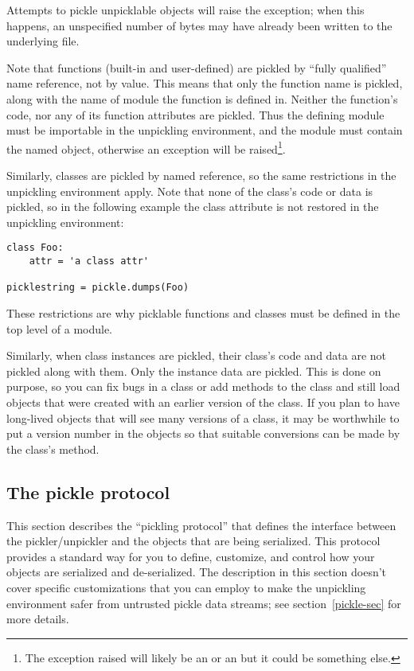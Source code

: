 Attempts to pickle unpicklable objects will raise the
 exception; when this happens, an unspecified
number of bytes may have already been written to the underlying file.

Note that functions (built-in and user-defined) are pickled by ``fully
qualified'' name reference, not by value.  This means that only the
function name is pickled, along with the name of module the function
is defined in.  Neither the function's code, nor any of its function
attributes are pickled.  Thus the defining module must be importable
in the unpickling environment, and the module must contain the named
object, otherwise an exception will be raised\footnote{The exception
raised will likely be an  or an
 but it could be something else.}.

Similarly, classes are pickled by named reference, so the same
restrictions in the unpickling environment apply.  Note that none of
the class's code or data is pickled, so in the following example the
class attribute  is not restored in the unpickling
environment:

\begin{verbatim}
class Foo:
    attr = 'a class attr'

picklestring = pickle.dumps(Foo)
\end{verbatim}

These restrictions are why picklable functions and classes must be
defined in the top level of a module.

Similarly, when class instances are pickled, their class's code and
data are not pickled along with them.  Only the instance data are
pickled.  This is done on purpose, so you can fix bugs in a class or
add methods to the class and still load objects that were created with
an earlier version of the class.  If you plan to have long-lived
objects that will see many versions of a class, it may be worthwhile
to put a version number in the objects so that suitable conversions
can be made by the class's  method.

\subsection{The pickle protocol
\label{pickle-protocol}}

This section describes the ``pickling protocol'' that defines the
interface between the pickler/unpickler and the objects that are being
serialized.  This protocol provides a standard way for you to define,
customize, and control how your objects are serialized and
de-serialized.  The description in this section doesn't cover specific
customizations that you can employ to make the unpickling environment
safer from untrusted pickle data streams; see section~\ref{pickle-sec}
for more details.

